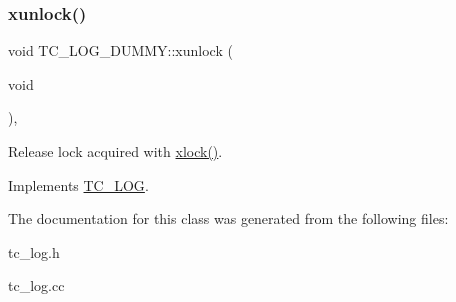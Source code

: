 \subsubsection{\texorpdfstring{xunlock()}{xunlock()}}
{\footnotesize\ttfamily void T\+C\+\_\+\+L\+O\+G\+\_\+\+D\+U\+M\+M\+Y\+::xunlock (\begin{DoxyParamCaption}\item[{void}]{ }\end{DoxyParamCaption})\hspace{0.3cm}{\ttfamily [inline]}, {\ttfamily [virtual]}}

Release lock acquired with \mbox{\hyperlink{classTC__LOG__DUMMY_a48cd538ebda31693671772018d2563b9}{xlock()}}. 

Implements \mbox{\hyperlink{classTC__LOG_a60ee380273adc9e23c56ff114cd2636a}{T\+C\+\_\+\+L\+OG}}.



The documentation for this class was generated from the following files\+:\begin{DoxyCompactItemize}
\item 
tc\+\_\+log.\+h\item 
tc\+\_\+log.\+cc\end{DoxyCompactItemize}

